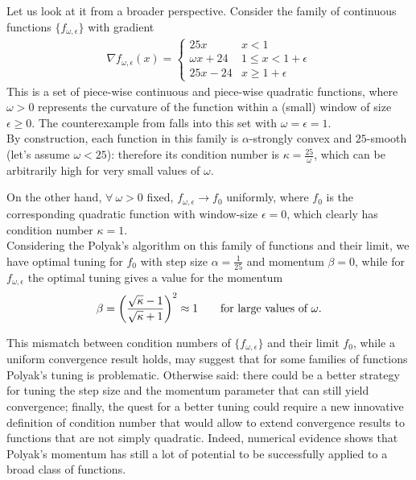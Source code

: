 \documentclass{article}
\begin{document}

Let us look at it from a broader perspective. Consider the family of continuous functions $\{f_{\omega,\epsilon}\}$ with gradient
\begin{gather}
	\nabla f_{\omega, \epsilon}(x) =  \begin{cases}
    25x &   x < 1 \\
    \omega x+24   &  1 \leq x < 1+\epsilon \\
    25x-24 & x \geq 1+\epsilon
\end{cases}
\end{gather}
This is a set of piece-wise continuous and piece-wise quadratic functions, where $\omega >0$ represents the curvature of the function within a (small) window of size $\epsilon \geq0$. The counterexample from \cite{2014arXiv1408.3595L} falls into this set with $\omega =\epsilon = 1$.\\

By construction, each function in this family is $\alpha$-strongly convex and $25$-smooth (let's assume $\omega <25$): therefore its condition number is $\kappa = \frac{25}{\omega}$, which can be arbitrarily high for very small values of $\omega$. 

On the other hand, $\forall \ \omega>0$ fixed, $f_{\omega, \epsilon} \to f_0$ uniformly, where $f_0$ is the corresponding quadratic function with window-size $\epsilon =0$, which clearly has condition number $\kappa = 1$.\\

Considering the Polyak's algorithm on this family of functions and their limit, we have optimal tuning for $f_0$ with step size $\alpha = \frac{1}{25}$ and momentum $\beta = 0$, while for $f_{\omega,\epsilon}$ the optimal tuning gives a value for the momentum 
$$\beta = \left(\dfrac{\sqrt{\kappa} -1}{\sqrt{\kappa}+1}\right)^2 \approx 1 \qquad \text{for large values of } \omega.$$

This mismatch between condition numbers of $\{f_{\omega,\epsilon}\}$ and their limit $f_0$, while a uniform convergence result holds, may suggest that for some families of functions Polyak's tuning is problematic. Otherwise said: there could be a better strategy for tuning the step size and the momentum parameter that can still yield convergence; finally, the quest for a better tuning could require a new innovative definition of condition number that would allow to extend convergence results to functions that are not simply quadratic. 
Indeed, numerical evidence shows that Polyak's momentum has still a lot of potential to be successfully applied to a broad class of functions.
\end{document}
